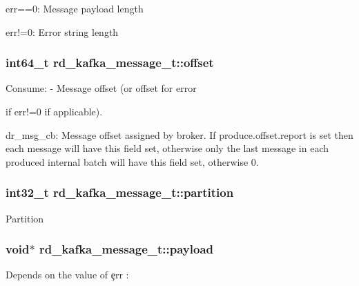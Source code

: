 \begin{DoxyItemize}
\item {\ttfamily err==0}\-: Message payload length
\item {\ttfamily err!=0}\-: Error string length 
\end{DoxyItemize}\hypertarget{structrd__kafka__message__t_a979bd27da570c93768e474527ddb136e}{
\subsubsection[{offset}]{\setlength{\rightskip}{0pt plus 5cm}int64\-\_\-t rd\-\_\-kafka\-\_\-message\-\_\-t\-::offset}}\label{structrd__kafka__message__t_a979bd27da570c93768e474527ddb136e}
\begin{DoxyVerb}        Consume:
          - Message offset (or offset for error
\end{DoxyVerb}
 if {\ttfamily err!=0} if applicable).
\begin{DoxyItemize}
\item dr\-\_\-msg\-\_\-cb\-: Message offset assigned by broker. If {\ttfamily produce.\-offset.\-report} is set then each message will have this field set, otherwise only the last message in each produced internal batch will have this field set, otherwise 0. 
\end{DoxyItemize}\hypertarget{structrd__kafka__message__t_aad65babd39a553e48269e7469e36a09a}{
\subsubsection[{partition}]{\setlength{\rightskip}{0pt plus 5cm}int32\-\_\-t rd\-\_\-kafka\-\_\-message\-\_\-t\-::partition}}\label{structrd__kafka__message__t_aad65babd39a553e48269e7469e36a09a}
Partition \hypertarget{structrd__kafka__message__t_aa78acb7414a91d7009268e84b1526b7f}{
\subsubsection[{payload}]{\setlength{\rightskip}{0pt plus 5cm}void$\ast$ rd\-\_\-kafka\-\_\-message\-\_\-t\-::payload}}\label{structrd__kafka__message__t_aa78acb7414a91d7009268e84b1526b7f}
\begin{DoxyVerb}         Depends on the value of \c err :
\end{DoxyVerb}

